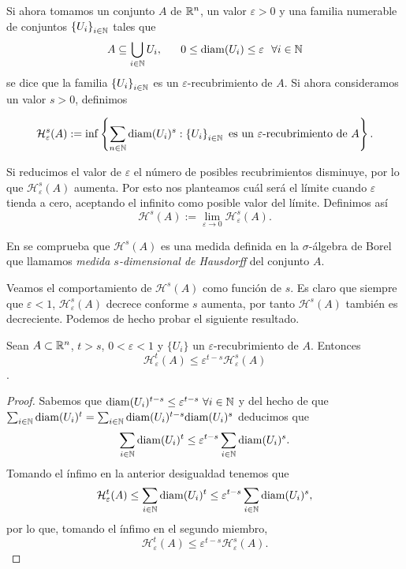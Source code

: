 Si ahora tomamos un conjunto $A$ de $\mathbb{R}^n$, un valor $\varepsilon>0$ y una familia numerable de conjuntos $\left\lbrace U_i\right\rbrace_{i\in\mathbb{N}}$  tales que 
$$
A\subseteq\bigcup_{i\in\N} U_i, \ \ \ \ \ 0\leq\diam(U_i)\leq\varepsilon \ \ \forall i\in \N
$$
se dice que la familia $\left\lbrace U_i\right\rbrace_{i\in\mathbb{N}}$ es un $\varepsilon$-recubrimiento de $A$. Si ahora consideramos un valor $s>0$, definimos

$$
\mathcal{H}_\varepsilon^s(A):=\inf\left\lbrace\sum_{n\in\mathbb{N}} \mathrm{diam}(U_i)^s: \left\lbrace U_i\right\rbrace_{i\in\mathbb{N}} \text{ es un }\varepsilon\text{-recubrimiento de }A\right\rbrace.
$$

Si reducimos el valor de $\varepsilon$ el número de posibles recubrimientos disminuye, por lo que $\mathcal{H}_\varepsilon^s(A)$ aumenta. Por esto nos planteamos cuál será el límite cuando $\varepsilon$ tienda a cero, aceptando el infinito como posible valor del límite. Definimos así 
$$
\mathcal{H}^s(A) := \lim_{\varepsilon\rightarrow 0}\mathcal{H}_\varepsilon^s(A).
$$

En \cite[Secciones 5.2 y 5.4]{alma991007022459704990} se comprueba que $\mathcal{H}^s(A)$ es una medida definida en la $\sigma$-álgebra de Borel que llamamos \textit{medida $s$-dimensional de Hausdorff} del conjunto $A$.

Veamos el comportamiento de $\mathcal{H}^s(A)$ como función de $s$. Es claro que siempre que $\varepsilon < 1$, $\mathcal{H}_\varepsilon^s(A)$ decrece conforme $s$ aumenta, por tanto $\mathcal{H}^s(A)$ también es decreciente. Podemos de hecho probar el siguiente resultado.

\begin{proposicion}
  \label{prop:desigualdad}
  Sean $A\subset \mathbb{R}^n$, $t>s$, $0<\varepsilon<1$ y $\{U_i\}$ un $\varepsilon$-recubrimiento de $A$. Entonces 
  $$\mathcal{H}_\varepsilon^t(A)\leq \varepsilon^{t-s}\mathcal{H}_\varepsilon^s(A)$$. 
\end{proposicion}
\begin{proof}
  Sabemos que $\mathrm{diam}(U_i)^{t-s}\leq\varepsilon^{t-s} \ \forall i\in \mathbb{N}$ y del hecho de que $\sum_{i\in\mathbb{N}}\mathrm{diam}(U_i)^t=\sum_{i\in\mathbb{N}}\mathrm{diam}(U_i)^{t-s}\mathrm{diam}(U_i)^s$ deducimos que 
  $$
  \sum_{i\in\mathbb{N}}\mathrm{diam}(U_i)^t\leq\varepsilon^{t-s}\sum_{i\in\mathbb{N}}\mathrm{diam}(U_i)^{s}.
  $$
  Tomando el ínfimo en la anterior desigualdad tenemos que
  $$
  \mathcal{H}_\varepsilon^t(A)\leq\sum_{i\in\mathbb{N}}\mathrm{diam}(U_i)^t\leq\varepsilon^{t-s}\sum_{i\in\mathbb{N}}\mathrm{diam}(U_i)^{s},
  $$
  por lo que, tomando el ínfimo en el segundo miembro,
  $$\mathcal{H}_\varepsilon^t(A)\leq \varepsilon^{t-s}\mathcal{H}_\varepsilon^s(A).$$

\end{proof}

